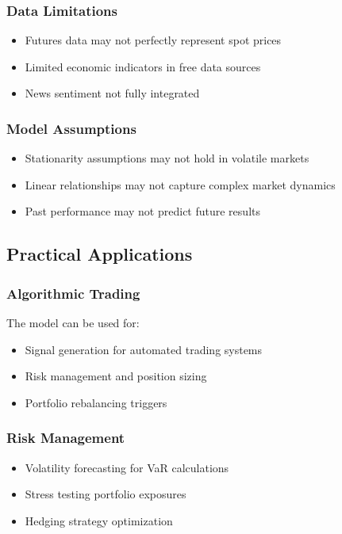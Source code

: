 \documentclass[12pt,a4paper]{article}
\begin{document}
\subsubsection{Data Limitations}
\begin{itemize}
    \item Futures data may not perfectly represent spot prices
    \item Limited economic indicators in free data sources
    \item News sentiment not fully integrated
\end{itemize}

\subsubsection{Model Assumptions}
\begin{itemize}
    \item Stationarity assumptions may not hold in volatile markets
    \item Linear relationships may not capture complex market dynamics
    \item Past performance may not predict future results
\end{itemize}

\subsection{Practical Applications}

\subsubsection{Algorithmic Trading}
The model can be used for:
\begin{itemize}
    \item Signal generation for automated trading systems
    \item Risk management and position sizing
    \item Portfolio rebalancing triggers
\end{itemize}

\subsubsection{Risk Management}
\begin{itemize}
    \item Volatility forecasting for VaR calculations
    \item Stress testing portfolio exposures
    \item Hedging strategy optimization
\end{itemize}
\end{document}
